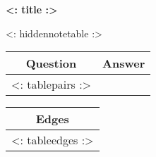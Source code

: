 \usepackage{longtable}


\begin{center}
  \textbf{<: title :>}

  \medskip

  <: hiddennotetable :>

  \bigskip

  \begin{longtable}{|c|c|}
    \hline
    \textbf{Question}&\textbf{Answer}\\\hline\endhead
    <: tablepairs :>
  \end{longtable}

  \bigskip

  \begin{longtable}{|c|}
    \hline
    \textbf{Edges}\\\hline\endhead
    <: tableedges :>
  \end{longtable}
\end{center}



